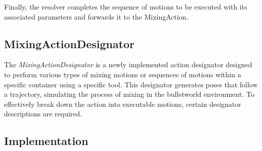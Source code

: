 Finally, the resolver completes the sequence of motions to be executed with its associated parameters and 
forwards it to the MixingAction.

\subsection{MixingActionDesignator}
The \textit{MixingActionDesignator} is a newly implemented action designator 
designed to perform various types of mixing motions or sequences of motions within a specific container using a specific tool. 
This designator generates poses that follow a trajectory, simulating the process of mixing in the bulletworld environment.
To effectively break down the action into executable motions, certain designator descriptions are required.

\subsection{Implementation}

